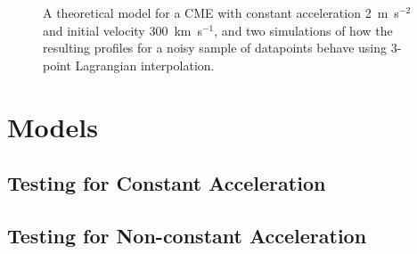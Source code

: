 \documentclass[preprint2]{aastex}
\begin{document}
\begin{figure}[ht]
\caption{A theoretical model for a CME with constant acceleration 2~m~s$^{-2}$ and initial velocity 300~km~s$^{-1}$, and two simulations of how the resulting profiles for a noisy sample of datapoints behave using 3-point Lagrangian interpolation.}
\label{sim_vels_thesis}
\end{figure}


\section{Models}
\subsection{Testing for Constant Acceleration}




\subsection{Testing for Non-constant Acceleration}
\end{document}
